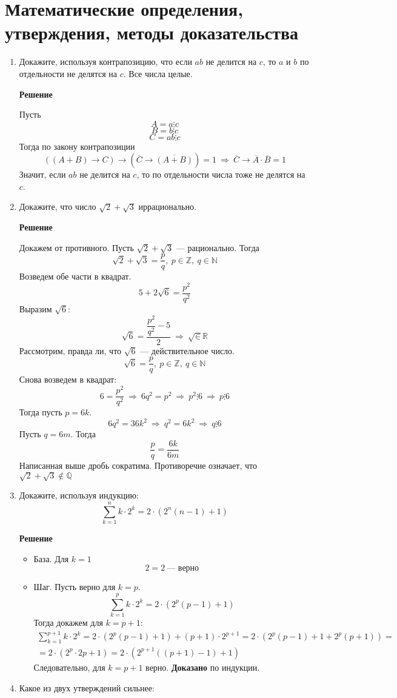 \documentclass[12pt]{article}
\begin{document}
	\section{Математические определения, утверждения, методы доказательства}
	\begin{enumerate}[label={\textbf{\arabic{section}.\arabic*}}]
		\item Докажите, используя контрапозицию, что если $ab$ не делится на $c$, то $a$ и $b$ по отдельности не делятся на $c$. Все числа целые.

		
		\textbf{Решение}
		
		Пусть\\		
		$$
		A = a \vdots c
		$$
		$$
		B = b \vdots c
		$$
		$$
		C = ab \vdots c
		$$
		Тогда по закону контрапозиции
		$$
		((A + B) \rightarrow C) \rightarrow (\overline{C} \rightarrow \overline{(A + B)}) = 1~\Rightarrow~\overline{C} \rightarrow \overline{A}\cdot\overline{B} = 1
		$$
		Значит, если $ab$ не делится на $c$, то по отдельности числа тоже не делятся на $c$.
		\item Докажите, что число $\sqrt{2} + \sqrt{3}$ иррационально.
		
		\textbf{Решение}
		
		Докажем от противного. Пусть $\sqrt{2} + \sqrt{3}$ --- рационально. Тогда
		$$
		\sqrt{2} + \sqrt{3} = \frac{p}{q},~p\in\mathbb{Z},~q\in\mathbb{N}
		$$
		Возведем обе части в квадрат. 
		$$
		5 + 2\sqrt{6} = \frac{p^2}{q^2}
		$$
		Выразим $\sqrt{6}$:
		$$
		\sqrt{6} = \frac{\dfrac{p^2}{q^2} - 5}{2}~\Rightarrow~\sqrt\in\mathbb{R}
		$$
		Рассмотрим, правда ли, что $\sqrt{6}$ --- действительное число.
		$$
		\sqrt{6} = \frac{p}{q},~p\in\mathbb{Z},~q\in\mathbb{N}
		$$
		Снова возведем в квадрат:
		$$
		6 = \frac{p^2}{q^2}~\Rightarrow~6q^2 = p^2~\Rightarrow~p^2 \vdots 6~\Rightarrow~p \vdots 6
		$$
		Тогда пусть $p = 6k$. 
		$$
		6q^2 = 36k^2~\Rightarrow~q^2 = 6k^2~\Rightarrow~q \vdots 6
		$$
		Пусть $q = 6m$. Тогда
		$$
		\frac{p}{q} = \frac{6k}{6m}
		$$
		Написанная выше дробь сократима. Противоречие означает, что $\sqrt{2} + \sqrt{3} \notin \mathbb{Q}$
		\item Докажите, используя индукцию:
		$$
		\sum\limits_{k=1}^n k\cdot 2^k = 2\cdot(2^n(n - 1) + 1)  
		$$
		
		\textbf{Решение}
		
		\begin{itemize}
			\item База. Для $k = 1$
			$$
			2 = 2~\text{--- верно}
			$$
			\item Шаг. Пусть верно для $k = p$. 
			$$
			\sum\limits_{k=1}^p k\cdot 2^k = 2\cdot(2^p(p - 1) + 1) 
			$$
			Тогда докажем для $k = p + 1$:
			\begin{multline*}
				\sum\limits_{k=1}^{p+1} k\cdot 2^k = 2\cdot(2^p(p - 1) + 1) + (p+1)\cdot2^{p+1} = 2\cdot(2^p(p - 1) + 1 +2^p(p+1)) =\\
				= 2\cdot (2^p\cdot2p + 1) = 2\cdot(2^{p+1}((p+1) - 1) + 1)
			\end{multline*}
			Следовательно, для $k = p + 1$ верно. \textbf{Доказано} по индукции.
		\end{itemize}
		\item Какое из двух утверждений сильнее:
		

\end{enumerate}
\end{document}
